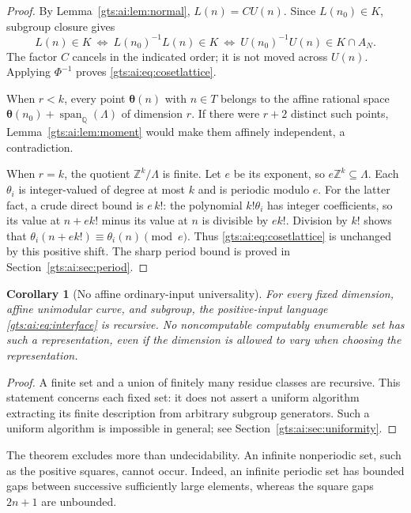 \documentclass[11pt,letterpaper]{article}
\newtheorem{corollary}[theorem]{Corollary}
\theoremstyle{definition}
\theoremstyle{remark}
\newcommand{\Z}{\mathbb Z}
\newcommand{\Q}{\mathbb Q}
\newcommand{\Span}{\operatorname{span}_{\Q}}
\newcommand{\vv}{\boldsymbol\theta}
\begin{document}
\begin{proof}
By Lemma~\ref{gts:ai:lem:normal}, $L(n)=CU(n)$. Since $L(n_0)\in K$, subgroup closure gives
\[
 L(n)\in K
 \ \Longleftrightarrow\ L(n_0)^{-1}L(n)\in K
 \ \Longleftrightarrow\ U(n_0)^{-1}U(n)\in K\cap A_N.
\]
The factor $C$ cancels in the indicated order; it is not moved across $U(n)$. Applying $\Phi^{-1}$ proves \eqref{gts:ai:eq:cosetlattice}.

When $r<k$, every point $\vv(n)$ with $n\in T$ belongs to the affine rational space $\vv(n_0)+\Span(\Lambda)$ of dimension $r$. If there were $r+2$ distinct such points, Lemma~\ref{gts:ai:lem:moment} would make them affinely independent, a contradiction.

When $r=k$, the quotient $\Z^k/\Lambda$ is finite. Let $e$ be its exponent, so $e\Z^k\subseteq\Lambda$. Each $\theta_i$ is integer-valued of degree at most $k$ and is periodic modulo $e$. For the latter fact, a crude direct bound is $e\,k!$: the polynomial $k!\theta_i$ has integer coefficients, so its value at $n+e k!$ minus its value at $n$ is divisible by $e k!$. Division by $k!$ shows that $\theta_i(n+e k!)\equiv\theta_i(n)\pmod e$. Thus \eqref{gts:ai:eq:cosetlattice} is unchanged by this positive shift. The sharp period bound is proved in Section~\ref{gts:ai:sec:period}.
\end{proof}
\begin{corollary}[No affine ordinary-input universality]\label{gts:ai:cor:noaffine}
For every fixed dimension, affine unimodular curve, and subgroup, the positive-input language \eqref{gts:ai:eq:interface} is recursive. No noncomputable computably enumerable set has such a representation, even if the dimension is allowed to vary when choosing the representation.
\end{corollary}
\begin{proof}
A finite set and a union of finitely many residue classes are recursive. This statement concerns each fixed set: it does not assert a uniform algorithm extracting its finite description from arbitrary subgroup generators. Such a uniform algorithm is impossible in general; see Section~\ref{gts:ai:sec:uniformity}.
\end{proof}
The theorem excludes more than undecidability. An infinite nonperiodic set, such as the positive squares, cannot occur. Indeed, an infinite periodic set has bounded gaps between successive sufficiently large elements, whereas the square gaps $2n+1$ are unbounded.
\end{document}
